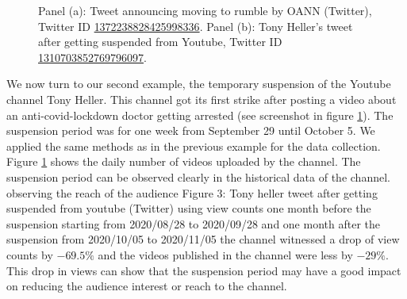 \documentclass{article}
\begin{document}
\begin{figure}
	\caption{Panel (a): Tweet announcing moving to rumble by OANN (Twitter), Twitter ID \href{https://twitter.com/OANN/status/1372238828425998336}{1372238828425998336}. Panel (b): Tony Heller's tweet after getting suspended from Youtube, Twitter ID \href{https://twitter.com/Tony\_Heller/status/1310703852769796097}{1310703852769796097}.}
	\label{fig2_oann}
\end{figure}

\smallskip

We now turn to our second example, the temporary suspension of the Youtube channel Tony Heller. This channel got its first strike after posting a video about an anti-covid-lockdown doctor getting arrested (see screenshot in figure \ref{fig2_oann}). The suspension period was for one week from September 29 until October 5. We applied the same methods as in the previous example for the data collection. Figure \ref{fig2_oann} shows the daily number of videos uploaded by the channel. The suspension period can be observed clearly in the historical data of the channel.  observing the reach of the audience 
Figure 3: Tony heller tweet after getting suspended from youtube (Twitter)
using view counts one month before the suspension starting from 2020/08/28 to 2020/09/28 and one month after the suspension from 2020/10/05 to 2020/11/05 the channel witnessed a drop of view counts by $-69.5\%$ and the videos published in the channel were less by $-29\%$. This drop in views can show that the  suspension  period
may  have  a  good  impact  on  reducing  the  audience interest or reach to the channel.
\end{document}
